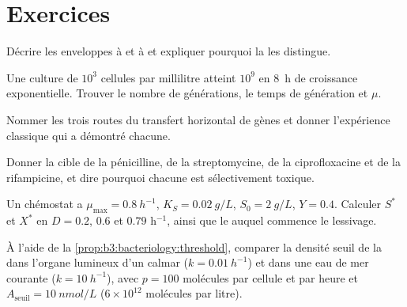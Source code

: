 \section{Exercices}

\begin{exercise}[$\star$]\label{exo:b3:bacteriology:1}
Décrire les enveloppes à  et à  et expliquer
pourquoi la  les distingue.
\end{exercise}

\begin{exercise}[$\star$]\label{exo:b3:bacteriology:2}
Une culture de $10^{3}$ cellules par millilitre atteint $10^{9}$ en
\qty{8}{h} de croissance exponentielle. Trouver le nombre de
générations, le temps de génération et $\mu$.
\end{exercise}

\begin{exercise}[$\star$]\label{exo:b3:bacteriology:3}
Nommer les trois routes du transfert horizontal de gènes et donner
l'expérience classique qui a démontré chacune.
\end{exercise}

\begin{exercise}[$\star$]\label{exo:b3:bacteriology:4}
Donner la cible de la pénicilline, de la streptomycine, de la
ciprofloxacine et de la rifampicine, et dire pourquoi chacune est
sélectivement toxique.
\end{exercise}

\begin{exercise}[$\star\star$]\label{exo:b3:bacteriology:5}
Un chémostat a $\mu_{\max} = \qty{0.8}{h^{-1}}$, $K_{S} =
\qty{0.02}{g/L}$, $S_{0} = \qty{2}{g/L}$, $Y = 0.4$. Calculer $S^{*}$ et
$X^{*}$ en $D = 0.2$, $0.6$ et $0.79$ h$^{-1}$, ainsi que le  auquel commence le lessivage.
\end{exercise}

\begin{exercise}[$\star\star$]\label{exo:b3:bacteriology:6}
À l'aide de la \cref{prop:b3:bacteriology:threshold}, comparer la
densité seuil de la  dans l'organe lumineux d'un
calmar ($k =
\qty{0.01}{h^{-1}}$) et dans une eau de mer courante
($k = \qty{10}{h^{-1}}$), avec $p = 100$ molécules par cellule et par
heure et $A_{\text{seuil}} =
\qty{10}{nmol/L}$ ($6\times 10^{12}$ molécules par litre).
\end{exercise}


